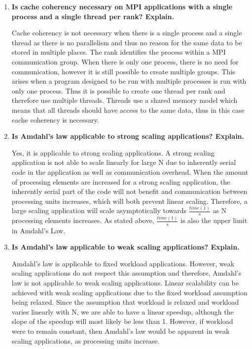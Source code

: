 \documentclass[10pt, letterpaper, twoside]{article}
\begin{document}
\begin{titlepage}
\begin{enumerate}
\item\textbf{Is cache coherency necessary on MPI applications with a single process and a single thread per rank? Explain.} 

Cache coherency is not necessary when there is a single process and a single thread as there is no parallelism and thus no reason for the same data to be stored in multiple places. The rank identifies the process within a MPI communication group. When there is only one process, there is no need for communication, however it is still possible to create multiple groups. This arises when a program
designed to be run with multiple processes is run with only one process. Thus it is possible to create one thread per rank and therefore use multiple threads. Threads use a shared memory model which means that all threads should have access to the same data, thus in this case cache coherency is necessary. \\

\item\textbf{Is Amdahl’s law applicable to strong scaling applications? Explain.} 

Yes, it is applicable to strong scaling applications. A strong scaling application is not able to scale linearly for large N due to
inherently serial code in the application as well as communication overhead. When the amount of processing elements are increased for a strong scaling application, the inherently serial part of the code will not benefit and communication between processing units increases, which will both prevent linear scaling. Therefore, a large scaling application will scale asymptotically towards \( \frac{time(1)}{s} \) as N processing elements increases. As stated above, \( \frac{time(1)}{s} \) is also the upper limit in Amdahl's Law. \\

\item\textbf{Is Amdahl’s law applicable to weak scaling applications? Explain.} 

Amdahl's law is applicable to fixed workload applications. However, weak scaling applications do not respect this assumption and therefore, Amdahl's law is not applicable to weak scaling applications. Linear scalability can be achieved with weak scaling applications due to the fixed workload assumption being relaxed. Since the assumption that workload is relaxed and workload varies linearly with N, we are able to have a linear speedup, although the slope of the speedup will most likely be less than 1. However, if workload were to remain constant, then Amdahl's law would be apparent in weak scaling applications, as processing units increase. \\


\end{enumerate}
\end{titlepage}
\end{document}
